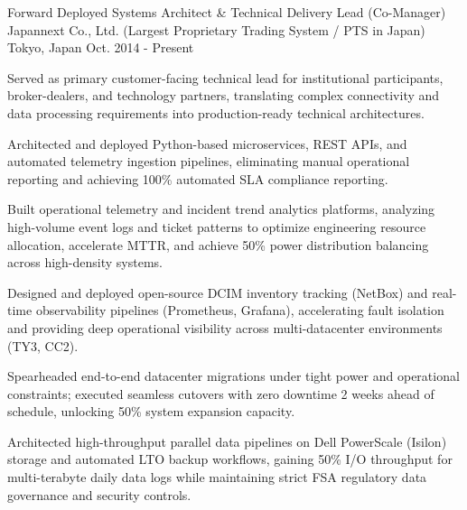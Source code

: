

\begin{cventries}

  \cventry
    {Forward Deployed Systems Architect \& Technical Delivery Lead (Co-Manager)} %
    {Japannext Co., Ltd. (Largest Proprietary Trading System / PTS in Japan)} %
    {Tokyo, Japan} %
    {Oct. 2014 - Present} %
    {
      \begin{cvitems} %
        \item {Served as primary customer-facing technical lead for institutional participants, broker-dealers, and technology partners, translating complex connectivity and data processing requirements into production-ready technical architectures.}
        \item {Architected and deployed Python-based microservices, REST APIs, and automated telemetry ingestion pipelines, eliminating manual operational reporting and achieving 100\% automated SLA compliance reporting.}
        \item {Built operational telemetry and incident trend analytics platforms, analyzing high-volume event logs and ticket patterns to optimize engineering resource allocation, accelerate MTTR, and achieve 50\% power distribution balancing across high-density systems.}
        \item {Designed and deployed open-source DCIM inventory tracking (NetBox) and real-time observability pipelines (Prometheus, Grafana), accelerating fault isolation and providing deep operational visibility across multi-datacenter environments (TY3, CC2).}
        \item {Spearheaded end-to-end datacenter migrations under tight power and operational constraints; executed seamless cutovers with zero downtime 2 weeks ahead of schedule, unlocking 50\% system expansion capacity.}
        \item {Architected high-throughput parallel data pipelines on Dell PowerScale (Isilon) storage and automated LTO backup workflows, gaining 50\% I/O throughput for multi-terabyte daily data logs while maintaining strict FSA regulatory data governance and security controls.}
      \end{cvitems}
    }


\end{cventries}
